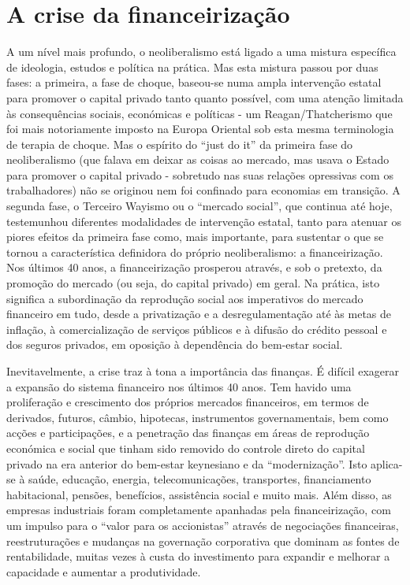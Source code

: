 \section{A crise da financeirização}
 \par 
A um nível mais profundo, o neoliberalismo está ligado a uma mistura específica de ideologia, estudos e política na prática. Mas esta mistura passou por duas fases: a primeira, a fase de choque, baseou-se numa ampla intervenção estatal para promover o capital privado tanto quanto possível, com uma atenção limitada às consequências sociais, económicas e políticas - um Reagan/Thatcherismo que foi mais notoriamente imposto na Europa Oriental sob esta mesma terminologia de terapia de choque. Mas o espírito do “just do it” da primeira fase do neoliberalismo (que falava em deixar as coisas ao mercado, mas usava o Estado para promover o capital privado - sobretudo nas suas relações opressivas com os trabalhadores) não se originou nem foi confinado para economias em transição. A segunda fase, o Terceiro Wayismo ou o “mercado social”, que continua até hoje, testemunhou diferentes modalidades de intervenção estatal, tanto para atenuar os piores efeitos da primeira fase como, mais importante, para sustentar o que se tornou a característica definidora do próprio neoliberalismo: a financeirização. Nos últimos {\color{blue}40} anos, a financeirização prosperou através, e sob o pretexto, da promoção do mercado (ou seja, do capital privado) em geral. Na prática, isto significa a subordinação da reprodução social aos imperativos do mercado financeiro em tudo, desde a privatização e a desregulamentação até às metas de inflação, à comercialização de serviços públicos e à difusão do crédito pessoal e dos seguros privados, em oposição à dependência do bem-estar social.
 \par 
Inevitavelmente, a crise traz à tona a importância das finanças. É difícil exagerar a expansão do sistema financeiro nos últimos {\color{blue}40} anos. Tem havido uma proliferação e crescimento dos próprios mercados financeiros, em termos de derivados, futuros, câmbio, hipotecas, instrumentos governamentais, bem como acções e participações, e a penetração das finanças em áreas de reprodução económica e social que tinham sido removido do controle direto do capital privado na era anterior do bem-estar keynesiano e da “modernização”. Isto aplica-se à saúde, educação, energia, telecomunicações, transportes, financiamento habitacional, pensões, benefícios, assistência social e muito mais. Além disso, as empresas industriais foram completamente apanhadas pela financeirização, com um impulso para o “valor para os accionistas” através de negociações financeiras, reestruturações e mudanças na governação corporativa que dominam as fontes de rentabilidade, muitas vezes à custa do investimento para expandir e melhorar a capacidade e aumentar a produtividade.
